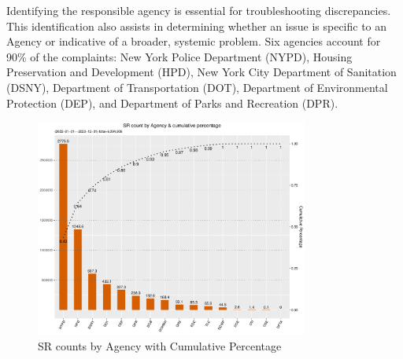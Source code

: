 \documentclass[linenumber]{jdsart}
\begin{document}
Identifying the responsible agency is essential 
for troubleshooting discrepancies. This identification also assists in 
determining whether an issue is specific to an Agency or indicative 
of a broader, systemic problem. Six agencies account for 90\% of 
the complaints: New York Police Department (NYPD), 
Housing Preservation and Development (HPD),
New York City Department of Sanitation (DSNY), Department of
Transportation (DOT), Department of Environmental Protection (DEP),
and Department of Parks and Recreation (DPR).

\begin{figure}[tbp]
	\centering
	\includegraphics[width=0.8\textwidth]{SRs_by_Agency.pdf}
  	\caption{SR counts by Agency with Cumulative Percentage}
	\label{fig:SRcountbyAgency}
\end{figure}

\end{document}
